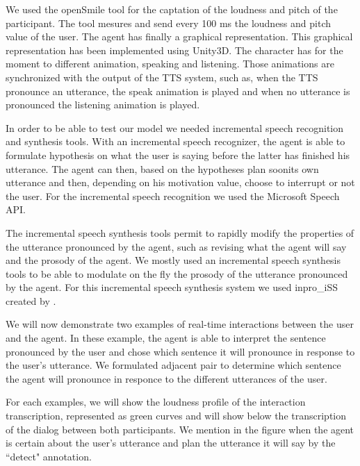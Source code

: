We used the openSmile tool \citep{eyben_recent_2013} for the captation of the loudness and pitch of the participant. The tool mesures and send every 100 ms the loudness and pitch value of the user. The agent has finally a graphical representation. This graphical representation has been implemented using Unity3D. The character has for the moment to different animation, speaking and listening. Those animations are synchronized with the output of the TTS system, such as, when the TTS pronounce an utterance, the speak animation is played and when no utterance is pronounced the listening animation is played. 

In order to be able to test our model we needed incremental speech recognition and synthesis tools. With an incremental speech recognizer, the agent is able to formulate hypothesis on what the user is saying before the latter has finished his utterance. The agent can then, based on the hypotheses plan soonits own utterance and then, depending on his motivation value, choose to interrupt or not the user. For the incremental speech recognition we used the Microsoft Speech API. 

The incremental speech synthesis tools permit to rapidly modify the properties of the utterance pronounced by the agent, such as revising what the agent will say and the prosody of the agent. We mostly used an incremental speech synthesis tools to be able to modulate on the fly the prosody of the utterance pronounced by the agent. For this incremental speech synthesis system we used inpro\_iSS created by \cite{baumann_inpro_2012}. 

We will now demonstrate two examples of real-time interactions between the user and the agent. In these example, the agent is able to interpret the sentence pronounced by the user and chose which sentence it will pronounce in response to the user's utterance. We formulated adjacent pair to determine which sentence the agent will pronounce in responce to the different utterances of the user. 

For each examples, we will show the loudness profile of the interaction transcription, represented as green curves and will show below the transcription of the dialog between both participants. We mention in the figure when the agent is certain about the user's utterance and plan the utterance it will say by the ``detect" annotation. 

